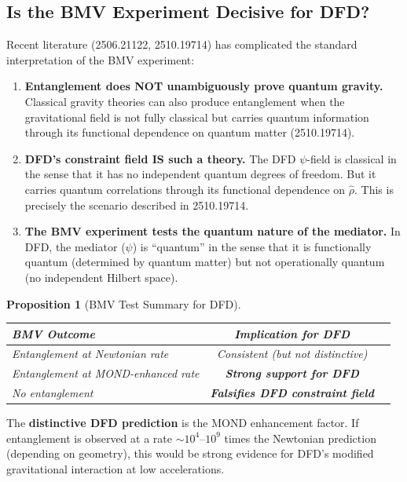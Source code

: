 \documentclass[11pt,a4paper]{article}
\newtheorem{proposition}{Proposition}
\begin{document}
\subsection{Is the BMV Experiment Decisive for DFD?}
\label{sec:BMV-decisive}

Recent literature (2506.21122, 2510.19714) has complicated the standard interpretation of the BMV experiment:

\begin{enumerate}
\item \textbf{Entanglement does NOT unambiguously prove quantum gravity.} Classical gravity theories can also produce entanglement when the gravitational field is not fully classical but carries quantum information through its functional dependence on quantum matter (2510.19714).

\item \textbf{DFD's constraint field IS such a theory.} The DFD $\psi$-field is classical in the sense that it has no independent quantum degrees of freedom. But it carries quantum correlations through its functional dependence on $\hat\rho$. This is precisely the scenario described in 2510.19714.

\item \textbf{The BMV experiment tests the quantum nature of the mediator.} In DFD, the mediator ($\psi$) is ``quantum'' in the sense that it is functionally quantum (determined by quantum matter) but not operationally quantum (no independent Hilbert space).
\end{enumerate}

\begin{proposition}[BMV Test Summary for DFD]
\begin{center}
\begin{tabular}{lcc}
\toprule
\textbf{BMV Outcome} & \textbf{Implication for DFD} \\
\midrule
Entanglement at Newtonian rate & Consistent (but not distinctive) \\
Entanglement at MOND-enhanced rate & \textbf{Strong support for DFD} \\
No entanglement & \textbf{Falsifies DFD constraint field} \\
\bottomrule
\end{tabular}
\end{center}
\end{proposition}

The \textbf{distinctive DFD prediction} is the MOND enhancement factor. If entanglement is observed at a rate $\sim 10^4$--$10^9$ times the Newtonian prediction (depending on geometry), this would be strong evidence for DFD's modified gravitational interaction at low accelerations.
\end{document}
